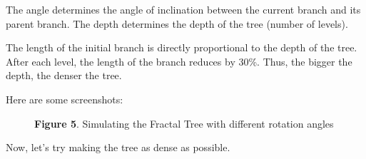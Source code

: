 \documentclass{resonance}
\begin{document}
	The angle determines the angle of inclination between the current branch and its parent branch. The depth determines the depth of the tree (number of levels).
	
	The length of the initial branch is directly proportional to the depth of the tree. After each level, the length of the branch reduces by 30\%. Thus, the bigger the depth, the denser the tree.
	
	Here are some screenshots:
	
	\pagebreak
	
	\begin{figure}[ht]
		
		\vspace{10pt}
		\hspace{-10pt}\scriptsize{\textbf{Figure 5}. \normalfont Simulating the Fractal Tree with different rotation angles}
	\end{figure}
	
	\setlength{\leftskip}{-0cm}
	Now, let's try making the tree as dense as possible.\\
	
\end{document}
